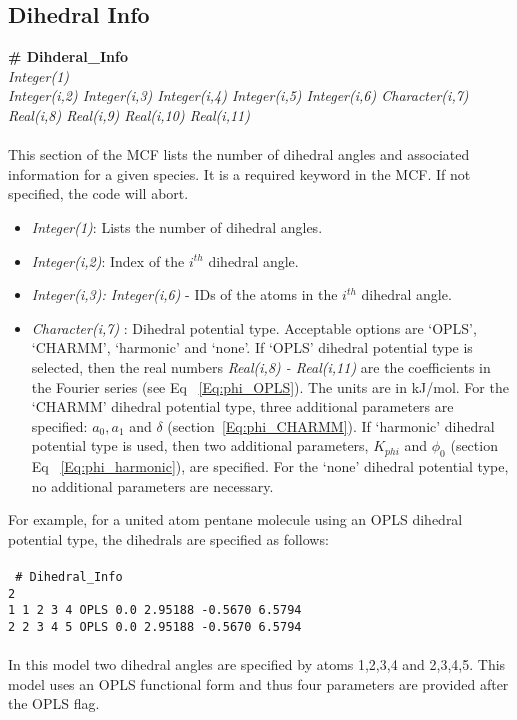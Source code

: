 \subsection{Dihedral Info}\label{sec:Get_Dihedral_Info}
%
{\bf \# Dihderal\_Info} \\ 
%
{\it Integer(1)} \\
%
{\it Integer(i,2) Integer(i,3) Integer(i,4) Integer(i,5) Integer(i,6)
  Character(i,7) Real(i,8) Real(i,9) Real(i,10) Real(i,11)} \\ \\
%
This section of the MCF lists the number of dihedral angles and 
associated information for a given species. It is a required keyword in the MCF. 
If not specified, the code
will abort.  

\begin{itemize}
%
\item {\it Integer(1)}: Lists the number of dihedral angles. 
%
\item {\it Integer(i,2)}: Index of the $i^{th}$ dihedral angle. 
%
\item {\it Integer(i,3): Integer(i,6)} - IDs of the atoms in the $i^{th}$
dihedral angle. 
%
\item {\it Character(i,7) }: Dihedral potential type. Acceptable options
are `OPLS', `CHARMM', `harmonic' and `none'. If `OPLS' dihedral
potential type is selected, then the real numbers {\it Real(i,8) -
  Real(i,11)} are the coefficients in the Fourier series
(see Eq ~\ref{Eq:phi_OPLS}). The units are in kJ/mol. For the `CHARMM'
dihedral potential type, three additional parameters are specified:
$a_0, a_1$ and $\delta$ (section~\ref{Eq:phi_CHARMM}).  If `harmonic' dihedral
potential type is used, then two additional parameters, $K_{phi}$ and
$\phi_0$ (section Eq ~\ref{Eq:phi_harmonic}), are specified.  For the `none' dihedral potential
type, no additional parameters are necessary.

\end{itemize}
%
For example, for a united atom pentane molecule using an OPLS dihedral potential type, 
the dihedrals are specified as follows:\\ \\
%
\texttt{
\# Dihedral\_Info\\
2\\
1    1    2    3    4    OPLS     0.0     2.95188     -0.5670     6.5794\\
2    2    3    4    5    OPLS     0.0     2.95188     -0.5670     6.5794\\
}\\
%
In this model two dihedral angles are specified by atoms 1,2,3,4 and 2,3,4,5. 
This model uses an OPLS functional form and thus four parameters are provided
after the OPLS flag.
%

